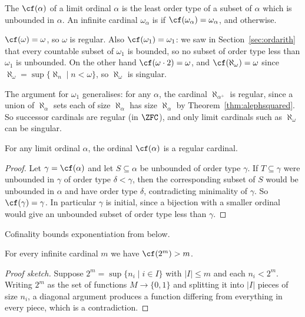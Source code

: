 \begin{definition}[Cofinality]
  The  $\cf(\alpha)$ of a limit ordinal $\alpha$ is the least order type of a subset of $\alpha$ which is unbounded in $\alpha$. An infinite cardinal $\omega_\alpha$ is  if $\cf(\omega_\alpha) = \omega_\alpha$, and  otherwise.
\end{definition}

\begin{example}
  $\cf(\omega) = \omega$, so $\omega$ is regular. Also $\cf(\omega_1) = \omega_1$: we saw in Section~\ref{sec:ordarith} that every countable subset of $\omega_1$ is bounded, so no subset of order type less than $\omega_1$ is unbounded. On the other hand $\cf(\omega \cdot 2) = \omega$, and $\cf(\aleph_\omega) = \omega$ since $\aleph_\omega = \sup\{\aleph_n \mid n < \omega\}$, so $\aleph_\omega$ is singular.
\end{example}

The argument for $\omega_1$ generalises: for any $\alpha$, the cardinal $\aleph_{\alpha^+}$ is regular, since a union of $\aleph_\alpha$ sets each of size $\aleph_\alpha$ has size $\aleph_\alpha$ by Theorem~\ref{thm:alephsquared}. So successor cardinals are regular (in $\ZFC$), and only limit cardinals such as $\aleph_\omega$ can be singular.

\begin{proposition}
  For any limit ordinal $\alpha$, the ordinal $\cf(\alpha)$ is a regular cardinal.
\end{proposition}
\begin{proof}
  Let $\gamma = \cf(\alpha)$ and let $S \subseteq \alpha$ be unbounded of order type $\gamma$. If $T \subseteq \gamma$ were unbounded in $\gamma$ of order type $\delta < \gamma$, then the corresponding subset of $S$ would be unbounded in $\alpha$ and have order type $\delta$, contradicting minimality of $\gamma$. So $\cf(\gamma) = \gamma$. In particular $\gamma$ is initial, since a bijection with a smaller ordinal would give an unbounded subset of order type less than $\gamma$.
\end{proof}

Cofinality bounds exponentiation from below.

\begin{theorem}[K\"onig]
  For every infinite cardinal $m$ we have $\cf(2^m) > m$.
\end{theorem}
\begin{proof}[Proof sketch]
  Suppose $2^m = \sup\{n_i \mid i \in I\}$ with $|I| \leq m$ and each $n_i < 2^m$. Writing $2^m$ as the set of functions $M \to \{0,1\}$ and splitting it into $|I|$ pieces of size $n_i$, a diagonal argument produces a function differing from everything in every piece, which is a contradiction.
\end{proof}


